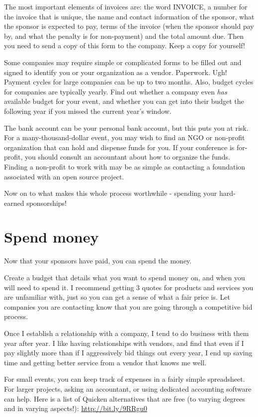 The most important elements of invoices are: the word INVOICE, a number for the
invoice that is unique, the name and contact information of the sponsor, what the
sponsor is expected to pay, terms of the invoice (when the sponsor should pay
by, and what the penalty is for non-payment) and the total amount due. Then you
need to send a copy of this form to the company. Keep a copy for yourself!

Some companies may require simple or complicated forms to be filled out and
signed to identify you or your organization as a vendor. Paperwork. Ugh! Payment
cycles for large companies can be up to two months. Also, budget cycles for
companies are typically yearly. Find out whether a company even \textit{has}
available budget for your event, and whether you can get into their budget the
following year if you missed the current year’s window.

The bank account can be your personal bank account, but this puts you at risk.
For a many-thousand-dollar event, you may wish to find an NGO or non-profit
organization that can hold and dispense funds for you. If your conference is
for-profit, you should consult an accountant about how to organize the funds.
Finding a non-profit to work with may be as simple as contacting a foundation
associated with an open source project. 

Now on to what makes this whole process worthwhile - spending your hard-earned
sponsorships!

\section*{Spend money}
Now that your sponsors have paid, you can spend the money. 

Create a budget that details what you want to spend money on, and when you will
need to spend it. I recommend getting 3 quotes for products and services you are
unfamiliar with, just so you can get a sense of what a fair price is. Let
companies you are contacting know that you are going through a competitive bid
process. 

Once I establish a relationship with a company, I tend to do business with them
year after year. I like having relationships with vendors, and find that even if
I pay slightly more than if I aggressively bid things out every year, I end up
saving time and getting better service from a vendor that knows me well. 

For small events, you can keep track of expenses in a fairly simple spreadsheet.
For larger projects, asking an accountant, or using dedicated accounting software
can help. Here is a list of Quicken alternatives that are free (to varying degrees
and in varying aspects!): \url{http://bit.ly/9RRgu0}

